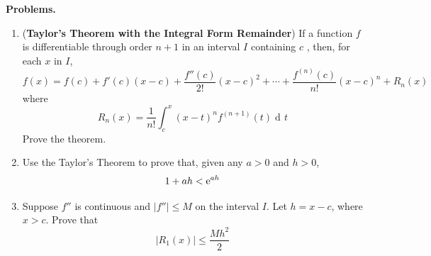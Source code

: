 \documentclass[10pt]{article}
\title{}
\date{}
\newcommand{\e}{{\rm e}}
\newcommand{\abs}[1]{\lvert #1 \rvert}
\DeclareMathOperator{\xd}{d\!}
\begin{document}
\noindent
{\bf Problems.}
\begin{enumerate}
\item ({\bf Taylor's Theorem with the Integral Form Remainder}) If a function $f$  is differentiable through order $n+1$ in an interval $I$  containing $c$ , then, for each $x$ in $I$,
\[
	f(x) = f(c) + f'(c)(x-c) + \frac{f''(c)}{2!}(x-c)^2 + \cdots + \frac{f^{(n)}(c)}{n!}(x-c)^n + R_n(x)
\]
where
\[
R_n(x) = \frac{1}{n!}\int_c^x(x-t)^nf^{(n+1)}(t)\xd t
\]
Prove the theorem.
\clearpage
\item Use the Taylor's Theorem to prove that, given any $a >0$ and $h>0$, 
\[
	1 + ah < \e^{ah}
\]
\item
Suppose $f''$ is continuous and $\abs{f''} \leq M$ on the interval $I$. Let $h = x - c$, where $x > c$.  Prove that
\[
\abs{R_1(x)} \leq \frac{Mh^2}{2}
\]
\end{enumerate}
\end{document}
